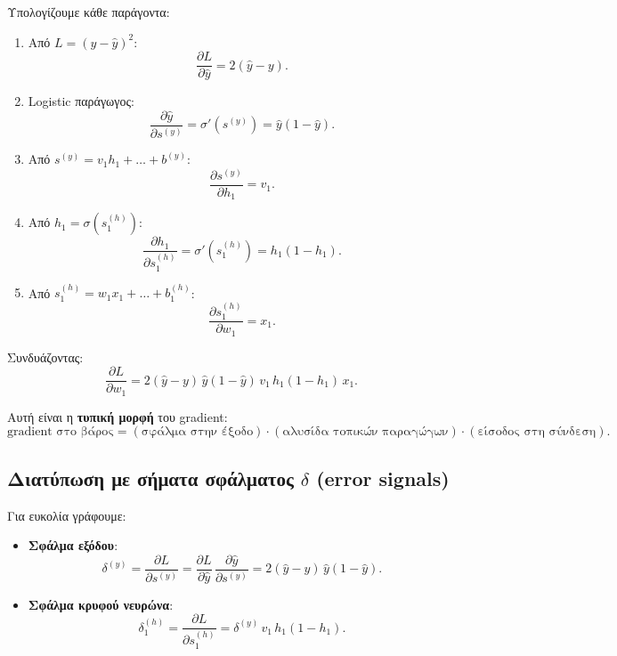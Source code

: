 \documentclass[a4paper,11pt]{article}
\begin{document}
Υπολογίζουμε κάθε παράγοντα:

\begin{enumerate}
  \item Από $L = (y-\hat{y})^2$:
        \[
        \frac{\partial L}{\partial \hat{y}}
        = 2(\hat{y} - y).
        \]
  \item Logistic παράγωγος:
        \[
        \frac{\partial \hat{y}}{\partial s^{(y)}}
        = \sigma'(s^{(y)}) = \hat{y}(1-\hat{y}).
        \]
  \item Από $s^{(y)} = v_1 h_1 + \dots + b^{(y)}$:
        \[
        \frac{\partial s^{(y)}}{\partial h_1} = v_1.
        \]
  \item Από $h_1 = \sigma(s^{(h)}_1)$:
        \[
        \frac{\partial h_1}{\partial s^{(h)}_1}
        = \sigma'(s^{(h)}_1) = h_1(1-h_1).
        \]
  \item Από $s^{(h)}_1 = w_1 x_1 + \dots + b^{(h)}_1$:
        \[
        \frac{\partial s^{(h)}_1}{\partial w_1} = x_1.
        \]
\end{enumerate}

Συνδυάζοντας:
\[
\frac{\partial L}{\partial w_1}
= 2(\hat{y} - y)\,\hat{y}(1-\hat{y})\, v_1\,
  h_1(1-h_1)\, x_1.
\]

Αυτή είναι η \textbf{τυπική μορφή} του gradient:
\[
\text{gradient στο βάρος}
= (\text{σφάλμα στην έξοδο})
\cdot (\text{αλυσίδα τοπικών παραγώγων})
\cdot (\text{είσοδος στη σύνδεση}).
\]

\subsection{Διατύπωση με σήματα σφάλματος $\delta$ (error signals)}

Για ευκολία γράφουμε:

\begin{itemize}
  \item \textbf{Σφάλμα εξόδου}:
        \[
        \delta^{(y)}
        = \frac{\partial L}{\partial s^{(y)}}
        = \frac{\partial L}{\partial \hat{y}}\,
          \frac{\partial \hat{y}}{\partial s^{(y)}}
        = 2(\hat{y}-y)\,\hat{y}(1-\hat{y}).
        \]
  \item \textbf{Σφάλμα κρυφού νευρώνα}:
        \[
        \delta^{(h)}_1
        = \frac{\partial L}{\partial s^{(h)}_1}
        = \delta^{(y)}\, v_1\, h_1(1-h_1).
        \]
\end{itemize}
\end{document}
